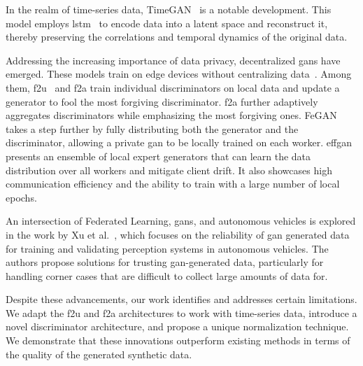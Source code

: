 In the realm of time-series data, TimeGAN~\cite{yoon_time-series_2019} is a notable development. This model employs \gls*{lstm}~\cite{hochreiter_long_1997} to encode data into a latent space and reconstruct it, thereby preserving the correlations and temporal dynamics of the original data.

Addressing the increasing importance of data privacy, decentralized \glspl*{gan} have emerged. These models train on edge devices without centralizing data~\cite{hardy_md-gan_2019}. Among them, \gls*{f2u}~\cite{yonetani_decentralized_2019} and \gls*{f2a} train individual discriminators on local data and update a generator to fool the most forgiving discriminator. \gls*{f2a} further adaptively aggregates discriminators while emphasizing the most forgiving ones. FeGAN~\cite{guerraoui_fegan_2020} takes a step further by fully distributing both the generator and the discriminator, allowing a private \gls*{gan} to be locally trained on each worker. \gls*{effgan}~\cite{ekblom_effgan_2022} presents an ensemble of local expert generators that can learn the data distribution over all workers and mitigate client drift. It also showcases high communication efficiency and the ability to train with a large number of local epochs.


An intersection of Federated Learning, \glspl*{gan}, and autonomous vehicles is explored in the work by Xu et al.~\cite{xu_reliability_2021}, which focuses on the reliability of \gls*{gan} generated data for training and validating perception systems in autonomous vehicles. The authors propose solutions for trusting \gls*{gan}-generated data, particularly for handling corner cases that are difficult to collect large amounts of data for.

Despite these advancements, our work identifies and addresses certain limitations. We adapt the \gls*{f2u} and \gls*{f2a} architectures to work with time-series data, introduce a novel discriminator architecture, and propose a unique normalization technique. We demonstrate that these innovations outperform existing methods in terms of the quality of the generated synthetic data.
